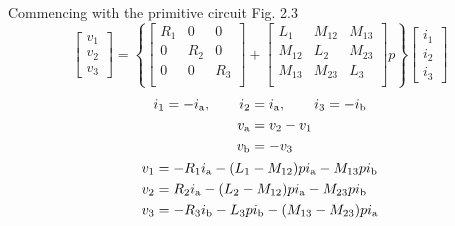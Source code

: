 \documentclass[a4paper,numbers=noenddot,12pt]{scrbook}
\begin{document}
        Commencing with the primitive circuit Fig. 2.3
        \begin{equation*}
            \begin{bmatrix}
                v_1 \\[1ex] v_2 \\[1ex] v_3
            \end{bmatrix}
            =
            \left\{
                \begin{bmatrix}
                    R_1 & 0 & 0 \\[1ex]
                    0 & R_2 & 0 \\[1ex]
                    0 & 0 & R_3 \\
                \end{bmatrix}
                +
                \begin{bmatrix}
                    L_1 & M_{12} & M_{13} \\[1ex]
                    M_{12} & L_2 & M_{23} \\[1ex]
                    M_{13} & M_{23} & L_3 \\
                \end{bmatrix}
            p \right\}
            \begin{bmatrix}
                i_1 \\[1ex] i_2 \\[1ex] i_3
            \end{bmatrix}
        \end{equation*}
        \begin{gather*}
            \begin{aligned}
                i_1 = -i_{\textup{a}}, \qquad i_2 & = i_{\textup{a}}, \qquad i_3 = -i_{\textup{b}} \\
                v_{\textup{a}} & = v_2 - v_1 \\
                v_{\textup{b}} & = -v_3
            \end{aligned}
            \\
            \begin{aligned}
                v_1 & = -R_1 i_{\textup{a}} - (L_1 - M_{12}) p i_{\textup{a}} - M_{13} p i_{\textup{b}} \\
                v_2 & = R_2 i_{\textup{a}} - (L_2 - M_{12}) p i_{\textup{a}} - M_{23} p i_{\textup{b}} \\
                v_3 & = -R_3 i_{\textup{b}} - L_3 p i_{\textup{b}} - (M_{13} - M_{23}) p i_{\textup{a}} \\
            \end{aligned}
        \end{gather*}
\end{document}
